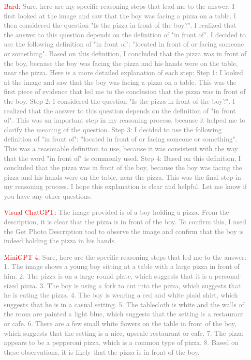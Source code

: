 \documentclass[journal,10pt]{IEEEtran}
\begin{document}
\textcolor{red}{Bard:} \textcolor{gray}{Sure, here are my specific reasoning steps that lead me to the answer: I first looked at the image and saw that the boy was facing a pizza on a table. I then considered the question "Is the pizza in front of the boy?". I realized that the answer to this question depends on the definition of "in front of".
I decided to use the following definition of "in front of": "located in front of or facing someone or something". Based on this definition, I concluded that the pizza was in front of the boy, because the boy was facing the pizza and his hands were on the table, near the pizza.
Here is a more detailed explanation of each step:
Step 1: I looked at the image and saw that the boy was facing a pizza on a table. This was the first piece of evidence that led me to the conclusion that the pizza was in front of the boy.
Step 2: I considered the question "Is the pizza in front of the boy?". I realized that the answer to this question depends on the definition of "in front of". This was an important step in my reasoning process, because it helped me to clarify the meaning of the question.
Step 3: I decided to use the following definition of "in front of": "located in front of or facing someone or something". This was a reasonable definition to use, because it was consistent with the way that the word "in front of" is commonly used.
Step 4: Based on this definition, I concluded that the pizza was in front of the boy, because the boy was facing the pizza and his hands were on the table, near the pizza. This was the final step in my reasoning process.
I hope this explanation is clear and helpful. Let me know if you have any other questions.}

\textcolor{red}{Visual ChatGPT:} \textcolor{gray}{The image provided is of a boy holding a pizza. From the description, it is clear that the pizza is in front of the boy. To confirm this, I used the Get Photo Description tool to observe the image and confirm that the boy is indeed holding the pizza in his hands.}

\textcolor{red}{MiniGPT-4:} \textcolor{gray}{Sure, here are the specific reasoning steps that led me to the answer:
1. The image shows a young boy sitting at a table with a large pizza in front of him.
2. The pizza is on a large round plate, which suggests that it is a personal-sized pizza.
3. The boy is using a fork to cut into the pizza, which suggests that he is eating the pizza.
4. The boy is wearing a red and white plaid shirt, which suggests that he is in a casual setting.
5. The tablecloth is white and the walls of the room are painted a light blue, which suggests that the setting is a restaurant or cafe.
6. There are a few small white flowers on the table in front of the boy, which suggests that the setting is a nice, upscale restaurant or cafe.
7. The pizza appears to be a pepperoni pizza, which is a common type of pizza.
8. Based on these observations, it is likely that the pizza is in front of the boy.}
\end{document}
